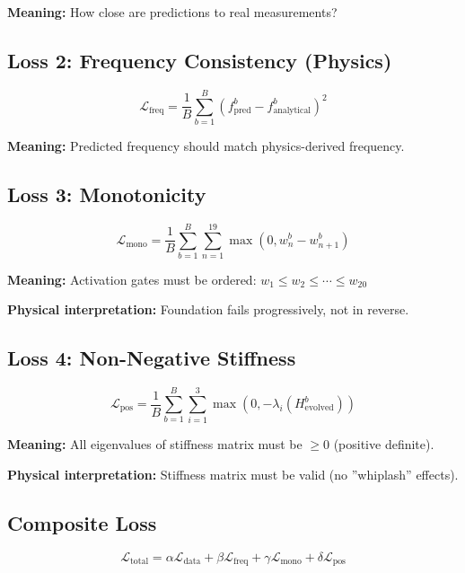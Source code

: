 \documentclass[11pt,a4paper]{article}
\begin{document}
\textbf{Meaning:} How close are predictions to real measurements?

\subsection{Loss 2: Frequency Consistency (Physics)}

\begin{equation}
\mathcal{L}_{\text{freq}} = \frac{1}{B}\sum_{b=1}^{B} (f_{\text{pred}}^b - f_{\text{analytical}}^b)^2
\end{equation}

\textbf{Meaning:} Predicted frequency should match physics-derived frequency.

\subsection{Loss 3: Monotonicity}

\begin{equation}
\mathcal{L}_{\text{mono}} = \frac{1}{B}\sum_{b=1}^{B} \sum_{n=1}^{19} \max(0, w_n^b - w_{n+1}^b)
\end{equation}

\textbf{Meaning:} Activation gates must be ordered: $w_1 \leq w_2 \leq \cdots \leq w_{20}$

\textbf{Physical interpretation:} Foundation fails progressively, not in reverse.

\subsection{Loss 4: Non-Negative Stiffness}

\begin{equation}
\mathcal{L}_{\text{pos}} = \frac{1}{B}\sum_{b=1}^{B} \sum_{i=1}^{3} \max(0, -\lambda_i(H_{\text{evolved}}^b))
\end{equation}

\textbf{Meaning:} All eigenvalues of stiffness matrix must be $\geq 0$ (positive definite).

\textbf{Physical interpretation:} Stiffness matrix must be valid (no ''whiplash'' effects).

\subsection{Composite Loss}

\begin{equation}
\mathcal{L}_{\text{total}} = \alpha \mathcal{L}_{\text{data}} + \beta \mathcal{L}_{\text{freq}} + \gamma \mathcal{L}_{\text{mono}} + \delta \mathcal{L}_{\text{pos}}
\end{equation}
\end{document}
